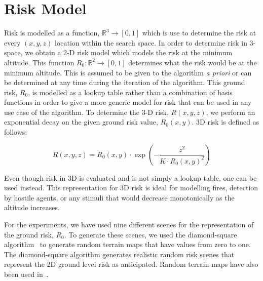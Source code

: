 \documentclass{article}
\begin{document}
\section{Risk Model}

Risk is modelled as a function, $\mathbb{R}^3 \rightarrow [0, 1]$ which is use
to determine the risk at every $(x, y, z)$ location within the search space. In
order to determine risk in 3-space, we obtain a 2-D risk model which models the
risk at the minimum altitude. This function $R_0 : \mathbb{R}^2 \rightarrow [0,
1]$ determines what the risk would be at the minimum altitude. This is assumed
to be given to the algorithm \emph{a priori} or can be determined at any time
during the iteration of the algorithm. This ground risk, $R_0$, is modelled as
a lookup table rather than a combination of basis functions in order to give a
more generic model for risk that can be used in any use case of the algorithm.
To determine the 3-D risk, $R(x, y, z)$, we perform an exponential decay on the
given ground risk value, $R_0(x, y)$. 3D risk is defined as follows:

$$ R(x, y, z) = R_0(x, y) \cdot \exp{\left(-\frac{z^2}{K \cdot R_0(x,
y)^2}\right)}$$

Even though risk in 3D is evaluated and is not simply a lookup table, one can
be used instead. This representation for 3D risk is ideal for modelling fires,
detection by hostile agents, or any stimuli that would decrease monotonically
as the altitude increases.

For the experiments, we have used nine different scenes for the representation
of the ground risk, $R_0$. To generate these scenes, we used the diamond-square
algorithm~\cite{DBLP:journals/cacm/FournierFC82} to generate random terrain
maps that have values from zero to one.  The diamond-square algorithm generates
realistic random risk scenes that represent the 2D ground level risk as
anticipated. Random terrain maps have also been used
in~\cite{DBLP:conf/icra/MurphyN11}.

 
\end{document}
